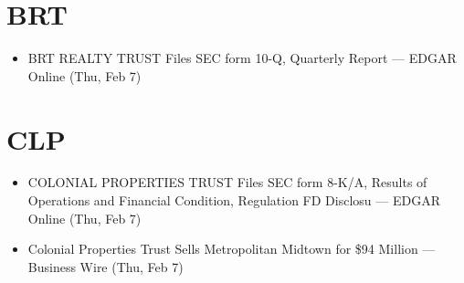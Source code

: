 \documentclass[11pt,asymmetric]{article}
\begin{document}
\section*{BRT}
\begin{itemize}
\item BRT REALTY TRUST Files SEC form 10-Q, Quarterly Report --- EDGAR Online (Thu, Feb 7)
\end{itemize}

\section*{CLP}
\begin{itemize}
\item COLONIAL PROPERTIES TRUST Files SEC form 8-K/A, Results of Operations and Financial Condition, Regulation FD Disclosu --- EDGAR Online (Thu, Feb 7)
\item Colonial Properties Trust Sells Metropolitan Midtown for \$94 Million --- Business Wire (Thu, Feb 7)
\end{itemize}
\end{document}

